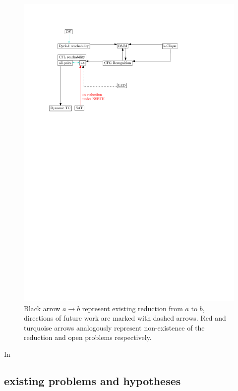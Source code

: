 \documentclass[acmsmall,review,nonacm]{acmart}\settopmatter{printfolios=true,printccs=false,printacmref=false}
\begin{document}
	\begin{figure}[!htp]
		
		\begin{center}  
			\includegraphics[scale = 0.6]{map_popl.pdf}
		\end{center}
	
		\caption{Black arrow $a \rightarrow b$ represent existing reduction from $a$ to $b$, directions of future work are marked with dashed arrows. Red and turquoise arrows analogously represent non-existence of the reduction and open problems respectively. }
		
	\end{figure}
	
	In \cite{valiant1975general}
	
	\subsection{existing problems and hypotheses}
	
\end{document}
